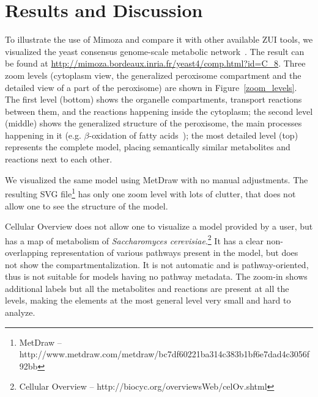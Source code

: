 \documentclass{bmcart}
\begin{document}
\section*{Results and Discussion}
To illustrate the use of Mimoza and compare it with other available ZUI tools, we visualized the yeast consensus genome-scale metabolic network~\cite{Herrgard2008}. The result can be found at \url{http://mimoza.bordeaux.inria.fr/yeast4/comp.html?id=C_8}. 
Three zoom levels (cytoplasm view, the generalized peroxisome compartment and the detailed view of a part of the peroxisome) are shown in Figure~\ref{zoom_levels}. The first level (bottom) shows the organelle compartments, transport reactions between them, and the reactions happening inside the cytoplasm; the second level (middle) shows the generalized structure of the peroxisome, the main processes happening in it (e.g. $\beta$-oxidation of fatty acids~\cite{Metzler01}); the most detailed level (top) represents the complete model, placing semantically similar metabolites and reactions next to each other.

We visualized the same model using MetDraw with no manual adjustments. The resulting SVG file\footnote{MetDraw -- http://www.metdraw.com/metdraw/bc7df60221ba314c383b1bf6e7dad4c3056f92bb} has only one zoom level with lots of clutter, that does not allow one to see the structure of the model.

Cellular Overview does not allow one to visualize a model provided by a user, but has a map of metabolism of \emph{Saccharomyces cerevisiae}.\footnote{Cellular Overview -- http://biocyc.org/overviewsWeb/celOv.shtml} It has a clear non-overlapping representation of various pathways present in the model, but does not show the compartmentalization. It is not automatic and is pathway-oriented, thus is not suitable for models having no pathway metadata. The zoom-in shows additional labels but all the metabolites and reactions are present at all the levels, making the elements at the most general level very small and hard to analyze.
\end{document}
